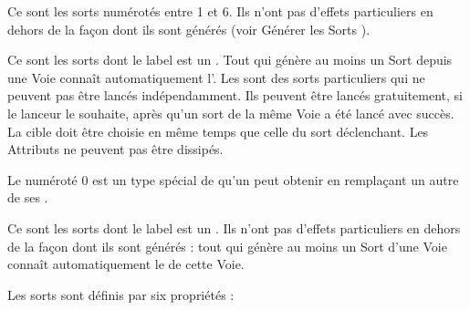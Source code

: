 \vspace*{-10pt}
\begin{multicols}{2}


\basicsubtitle{\learnedspells}

Ce sont les sorts numérotés entre 1 et 6. Ils n'ont pas d'effets particuliers en dehors de la façon dont ils sont générés (voir \og Générer les Sorts \fg{}).

\vspace*{-25pt}
\basictitlenotoc{\attributespellnumber}

\basicsubtitle{\attributespells}

Ce sont les sorts dont le label est un \og \attributespellnumber{} \fg{}. Tout \wizard{} qui génère au moins un Sort depuis une Voie connaît automatiquement l'\attributespell{}. Les \attributespells{} sont des sorts particuliers qui ne peuvent pas être lancés indépendamment. Ils peuvent être lancés gratuitement, si le lanceur le souhaite, après qu'un sort de la même Voie a été lancé avec succès. La cible doit être choisie en même temps que celle du sort déclenchant. Les Attributs ne peuvent pas être dissipés.

\columnbreak



Le \learnedspell{} numéroté 0 est un type spécial de \learnedspell{} qu'un \wizard{} peut obtenir en remplaçant un autre de ses \learnedspells{}.

\vspace*{-25pt}
\basictitlenotoc{\traitspellnumber}

\basicsubtitle{\traitspells}

Ce sont les sorts dont le label est un \og \traitspellnumber{} \fg{}. Ils n'ont pas d'effets particuliers en dehors de la façon dont ils sont générés : tout \wizard{} qui génère au moins un Sort d'une Voie connaît automatiquement le \traitspell{} de cette Voie.

\vspace*{\fill}
\end{multicols}

Les sorts sont définis par six propriétés :

